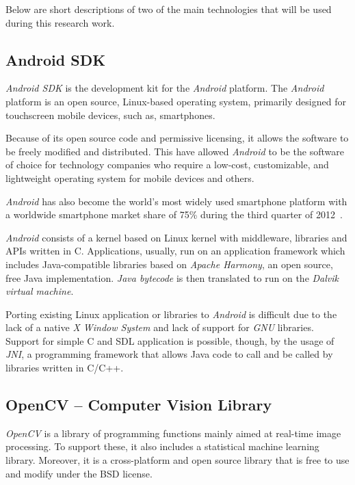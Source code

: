 Below are short descriptions of two of the main technologies that will be
used during this research work.

\subsection{Android SDK} \label{sec:sota:tech:android}

\emph{Android SDK} is the development kit for the \emph{Android}
platform. The \emph{Android} platform is an open source, Linux-based
operating system, primarily designed for touchscreen mobile devices,
such as, smartphones.

Because of its open source code and permissive licensing, it allows
the software to be freely modified and distributed. This have allowed
\emph{Android} to be the software of choice for technology companies
who require a low-cost, customizable, and lightweight operating system
for mobile devices and others.

\emph{Android} has also become the world's most widely used smartphone
platform with a worldwide smartphone market share of 75\%
during the third quarter of 2012~\cite{Idc2013Android}.

\emph{Android} consists of a kernel based on Linux kernel with middleware,
libraries and APIs written in C. Applications, usually, run on an application
framework which includes Java-compatible libraries based on
\emph{Apache Harmony}, an open source, free Java implementation.
\emph{Java bytecode} is then translated to run on the
\emph{Dalvik virtual machine}.

Porting existing Linux application or libraries to \emph{Android} is difficult
due to the lack of a native \emph{X Window System} and lack of support for
\emph{GNU} libraries. Support for simple C and SDL application is possible,
though, by the usage of \emph{JNI}, a programming framework that allows Java
code to call and be called by libraries written in C/C++.

\subsection{OpenCV -- Computer Vision Library} \label{sec:sota:tech:opencv}

\emph{OpenCV} is a library of programming functions mainly aimed at
real-time image processing. To support these, it also includes a
statistical machine learning library. Moreover, it is a cross-platform
and open source library that is free to use and modify under the BSD
license.

